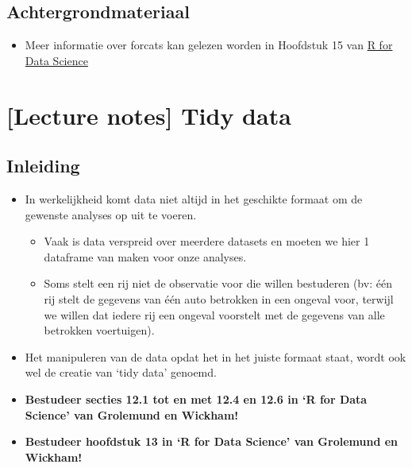\documentclass[]{tufte-book}
\providecommand{\tightlist}{%
  \setlength{\itemsep}{0pt}\setlength{\parskip}{0pt}}
\begin{document}
\hypertarget{achtergrondmateriaal}{%
\section{Achtergrondmateriaal}\label{achtergrondmateriaal}}

\begin{itemize}
\tightlist
\item
  Meer informatie over forcats kan gelezen worden in Hoofdstuk 15 van \href{https://r4ds.had.co.nz/factors.html}{R for Data Science}
\end{itemize}

\hypertarget{lecture-notes-tidy-data}{%
\chapter{{[}Lecture notes{]} Tidy data}\label{lecture-notes-tidy-data}}

\hypertarget{inleiding-1}{%
\section{Inleiding}\label{inleiding-1}}

\begin{itemize}
\tightlist
\item
  In werkelijkheid komt data niet altijd in het geschikte formaat om de gewenste analyses op uit te voeren.

  \begin{itemize}
  \tightlist
  \item
    Vaak is data verspreid over meerdere datasets en moeten we hier 1 dataframe van maken voor onze analyses.
  \item
    Soms stelt een rij niet de observatie voor die willen bestuderen (bv: één rij stelt de gegevens van één auto betrokken in een ongeval voor, terwijl we willen dat iedere rij een ongeval voorstelt met de gegevens van alle betrokken voertuigen).
  \end{itemize}
\item
  Het manipuleren van de data opdat het in het juiste formaat staat, wordt ook wel de creatie van `tidy data' genoemd.
\item
  \textbf{Bestudeer secties 12.1 tot en met 12.4 en 12.6 in `R for Data Science' van Grolemund en Wickham!}
\item
  \textbf{Bestudeer hoofdstuk 13 in `R for Data Science' van Grolemund en Wickham!}
\end{itemize}
\end{document}
